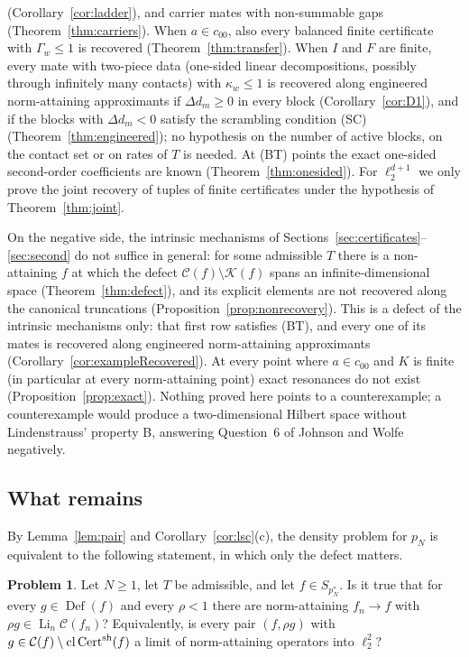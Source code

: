 \documentclass[10pt]{amsart}
\theoremstyle{definition}
\newtheorem{problem}[theorem]{Problem}
\theoremstyle{remark}
\newcommand{\Cset}{\mathcal C}
\newcommand{\Cert}{\operatorname{Cert}}
\newcommand{\Li}{\operatorname*{Li}}
\newcommand{\cl}{\operatorname{cl}}
\newcommand{\Def}{\operatorname{Def}}
\begin{document}
(Corollary~\ref{cor:ladder}), and carrier mates with non-summable gaps
(Theorem~\ref{thm:carriers}).  When $a\in c_{00}$, also every balanced
finite certificate with $\Gamma_w\le1$ is recovered
(Theorem~\ref{thm:transfer}).  When $I$ and $F$ are finite, every mate with
two-piece data (one-sided linear decompositions, possibly through infinitely
many contacts) with $\kappa_w\le1$ is recovered along engineered
norm-attaining approximants if $\Delta d_m\ge0$ in every block
(Corollary~\ref{cor:D1}), and if the blocks with $\Delta d_m<0$ satisfy the
scrambling condition \textup{(SC)} (Theorem~\ref{thm:engineered}); no
hypothesis on the number of active blocks, on the contact set or on rates of
$T$ is needed.  At \textup{(BT)} points the exact one-sided second-order
coefficients are known (Theorem~\ref{thm:onesided}).  For $\ell_2^{d+1}$ we
only prove the joint recovery of tuples of finite certificates under the
hypothesis of Theorem~\ref{thm:joint}.

On the negative side, the intrinsic mechanisms of
Sections~\ref{sec:certificates}--\ref{sec:second} do not suffice in general:
for some admissible $T$ there is a non-attaining $f$ at which the defect
$\Cset(f)\setminus\mathcal K(f)$ spans an infinite-dimensional space
(Theorem~\ref{thm:defect}), and its explicit elements are not recovered
along the canonical truncations (Proposition~\ref{prop:nonrecovery}).  This
is a defect of the intrinsic mechanisms only: that first row satisfies
\textup{(BT)}, and every one of its mates is recovered along engineered
norm-attaining approximants (Corollary~\ref{cor:exampleRecovered}).  At
every point where $a\in c_{00}$ and $K$ is finite (in particular at every
norm-attaining point) exact resonances do not exist
(Proposition~\ref{prop:exact}).  Nothing proved here points to a
counterexample; a counterexample would produce a two-dimensional Hilbert
space without Lindenstrauss' property B, answering Question~6 of Johnson and
Wolfe \cite{JW} negatively.

\subsection{What remains}
By Lemma~\ref{lem:pair} and Corollary~\ref{cor:lsc}(c), the density problem
for $p_N$ is equivalent to the following statement, in which only the defect
matters.

\begin{problem}\label{prob:main}
Let $N\ge1$, let $T$ be admissible, and let $f\in S_{p_N^*}$.  Is it true
that for every $g\in\Def(f)$ and every $\rho<1$ there are norm-attaining
$f_n\to f$ with $\rho g\in\Li_n\Cset(f_n)$?  Equivalently, is every pair
$(f,\rho g)$ with $g\in\Cset(f)\setminus\cl\Cert^{\rm sh}(f)$ a limit of
norm-attaining operators into $\ell_2^2$?
\end{problem}
\end{document}
